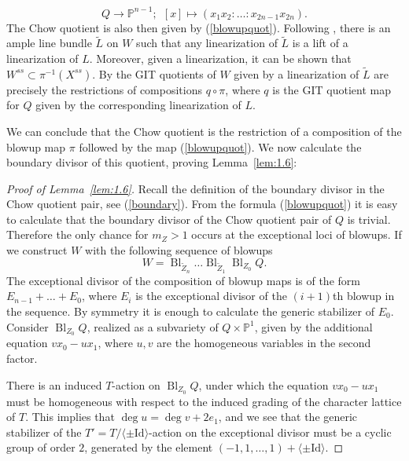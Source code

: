 \documentclass{amsart}
\theoremstyle{definition}
\newcommand{\PP}{\mathbb{P}}
\DeclareMathOperator{\Bl}{Bl}
\begin{document}
\begin{equation} \label{blowupquot}
Q \to \PP^{n-1}; \ \ [x] \mapsto (x_1x_2:\dots :x_{2n-1}x_{2n}).
\end{equation}
The Chow quotient is also then given by (\ref{blowupquot}). Following \cite{kirwan}, there is an ample line bundle \(\tilde{L}\) on \(W\) such that any linearization of \(\tilde{L}\) is a lift of a linearization of \(L\). Moreover, given a linearization, it can  be shown that \(W^{ss} \subset \pi^{-1}(X^{ss})\). By \cite[Lemma 3.11]{kirwan} the GIT quotients of \(W\) given by a linearization of \(\tilde{L}\) are precisely the restrictions of compositions \(q \circ \pi\), where \(q\) is the GIT quotient map for \(Q\) given by the corresponding linearization of \(L\).

We can conclude that the Chow quotient is the restriction of a composition of the blowup map \(\pi\) followed by the map (\ref{blowupquot}). We now calculate the boundary divisor of this quotient, proving Lemma~\ref{lem:1.6}:
\begin{proof}[Proof of Lemma~\ref{lem:1.6}]
Recall the definition of the boundary divisor in the Chow quotient pair, see (\ref{boundary}). From the formula (\ref{blowupquot}) it is easy to calculate that the boundary divisor of the Chow quotient pair of \(Q\) is trivial. Therefore the only chance for \(m_Z >1\) occurs at the exceptional loci of blowups. If we construct \(W\) with the following sequence of blowups
\[
W = \Bl_{\tilde{Z}_{n}} \dots \Bl_{\tilde{Z}_1} \Bl_{Z_0} Q.
\]
The exceptional divisor of the composition of blowup maps is of the form \(E_{n-1} + \dots + E_0\), where \(E_i\) is the exceptional divisor of the \((i+1)\)th blowup in the sequence. By symmetry it is enough to calculate the generic stabilizer of \(E_0\). Consider \(\Bl_{Z_0}Q\), realized as a subvariety of \(Q \times \PP^1 \), given by the additional equation \(vx_0 - ux_1\), where \(u,v\) are the homogeneous variables in the second factor.

There is an induced \(T\)-action on \(\Bl_{Z_0} Q\), under which the equation \(vx_0 - ux_1\) must be homogeneous with respect to the induced grading of the character lattice of \(T\). This implies that \(\deg u = \deg v + 2e_1\), and we see that the generic stabilizer of the \(T' = T/ \langle \pm \text{Id} \rangle \)-action on the exceptional divisor must be a cyclic group of order \(2\), generated by the element \((-1,1,\dots,1) + \langle \pm \text{Id} \rangle\). 
\end{proof}
\end{document}
